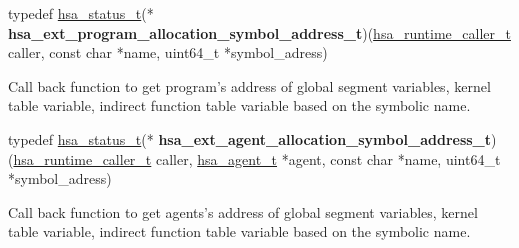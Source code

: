 \documentclass[final]{book}
\begin{document}
\noindent\begin{tcolorbox}[nobeforeafter,arc=0mm,colframe=white,colback=lightgray,left=0mm]
typedef \hyperlink{group__status_1gad755322e7ff95456520e8abdbe90d225}{hsa_status_t}(*  \hypertarget{group__HsailLinkerServiceLayer_1ga239d0ff41a3902d08da1c082739405a4}{\textbf{hsa_ext_program_allocation_symbol_address_t}})(\hyperlink{group__RuntimeCommon_1ga7d9b1191602415f5dd3893985cc93826}{hsa_runtime_caller_t} caller, const char *name, uint64_t *symbol_adress)
\end{tcolorbox}
Call back function to get program's address of global segment variables, kernel table variable, indirect function table variable based on the symbolic name.
\\

\noindent\begin{tcolorbox}[nobeforeafter,arc=0mm,colframe=white,colback=lightgray,left=0mm]
typedef \hyperlink{group__status_1gad755322e7ff95456520e8abdbe90d225}{hsa_status_t}(*  \hypertarget{group__HsailLinkerServiceLayer_1ga27a2745cd242e80be6cfceef2990585c}{\textbf{hsa_ext_agent_allocation_symbol_address_t}})(\hyperlink{group__RuntimeCommon_1ga7d9b1191602415f5dd3893985cc93826}{hsa_runtime_caller_t} caller, \hyperlink{group__topology_1gab8db3fb886332a24acac08ec361e1d86}{hsa_agent_t} *agent, const char *name, uint64_t *symbol_adress)
\end{tcolorbox}
Call back function to get agents's address of global segment variables, kernel table variable, indirect function table variable based on the symbolic name.
\\
\end{document}

